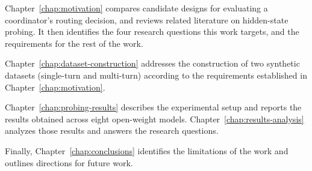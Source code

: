 Chapter~\ref{chap:motivation} compares candidate designs for evaluating a coordinator's routing decision, and reviews related literature on hidden-state probing. It then identifies the four research questions this work targets, and the requirements for the rest of the work.

Chapter~\ref{chap:dataset-construction} addresses the construction of two synthetic datasets (single-turn and multi-turn) according to the requirements established in Chapter~\ref{chap:motivation}.

Chapter~\ref{chap:probing-results} describes the experimental setup and reports the results obtained across eight open-weight models. Chapter~\ref{chap:results-analysis} analyzes those results and answers the research questions.

Finally, Chapter~\ref{chap:conclusions} identifies the limitations of the work and outlines directions for future work.
